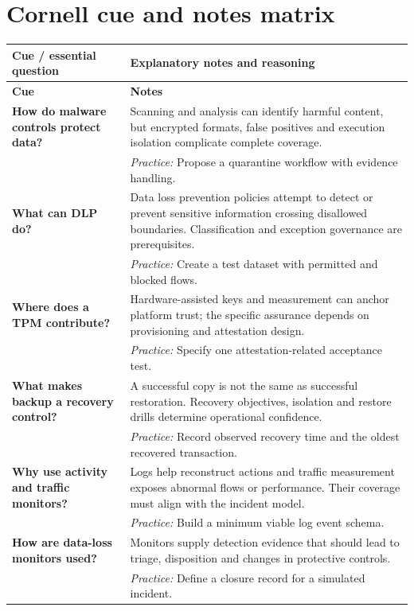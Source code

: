 \documentclass[10pt,letterpaper]{article}
\begin{document}
\section{Cornell cue and notes matrix}
\small\setlength{\LTleft}{0pt}\setlength{\LTright}{0pt plus 1fill}
\begin{longtable}{>{\RaggedRight\arraybackslash}p{}>{\RaggedRight\arraybackslash}p{}}
\toprule\textbf{Cue / essential question}&\textbf{Explanatory notes and reasoning}\\\midrule\endfirsthead\toprule\textbf{Cue}&\textbf{Notes}\\\midrule\endhead
\textbf{How do malware controls protect data?} & Scanning and analysis can identify harmful content, but encrypted formats, false positives and execution isolation complicate complete coverage.\\[3pt]& \textcolor{petrol}{\emph{Practice:} Propose a quarantine workflow with evidence handling.}\\[8pt]\midrule
\textbf{What can DLP do?} & Data loss prevention policies attempt to detect or prevent sensitive information crossing disallowed boundaries. Classification and exception governance are prerequisites.\\[3pt]& \textcolor{petrol}{\emph{Practice:} Create a test dataset with permitted and blocked flows.}\\[8pt]\midrule
\textbf{Where does a TPM contribute?} & Hardware-assisted keys and measurement can anchor platform trust; the specific assurance depends on provisioning and attestation design.\\[3pt]& \textcolor{petrol}{\emph{Practice:} Specify one attestation-related acceptance test.}\\[8pt]\midrule
\textbf{What makes backup a recovery control?} & A successful copy is not the same as successful restoration. Recovery objectives, isolation and restore drills determine operational confidence.\\[3pt]& \textcolor{petrol}{\emph{Practice:} Record observed recovery time and the oldest recovered transaction.}\\[8pt]\midrule
\textbf{Why use activity and traffic monitors?} & Logs help reconstruct actions and traffic measurement exposes abnormal flows or performance. Their coverage must align with the incident model.\\[3pt]& \textcolor{petrol}{\emph{Practice:} Build a minimum viable log event schema.}\\[8pt]\midrule
\textbf{How are data-loss monitors used?} & Monitors supply detection evidence that should lead to triage, disposition and changes in protective controls.\\[3pt]& \textcolor{petrol}{\emph{Practice:} Define a closure record for a simulated incident.}\\[8pt]\midrule
\end{longtable}\normalsize
\end{document}
